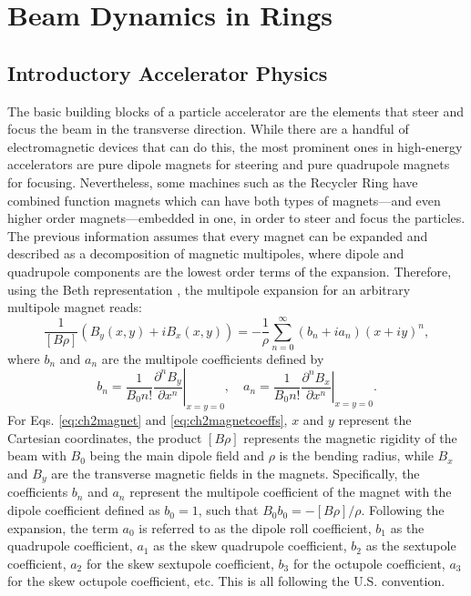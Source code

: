 \chapter{Beam Dynamics in Rings}
\label{sec:ch2}

\section{\label{sec:basic}Introductory Accelerator Physics}
The basic building blocks of a particle accelerator are the elements that steer and focus the beam in the transverse direction. While there are a handful of electromagnetic devices that can do this, the most prominent ones in high-energy accelerators are pure dipole magnets for steering and pure quadrupole magnets for focusing. Nevertheless, some machines such as the Recycler Ring have combined function magnets which can have both types of magnets---and even higher order magnets---embedded in one, in order to steer and focus the particles. The previous information assumes that every magnet can be expanded and described as a decomposition of magnetic multipoles, where dipole and quadrupole components are the lowest order terms of the expansion. Therefore, using the Beth representation \cite{sylee}, the multipole expansion for an arbitrary multipole magnet reads:
\begin{equation}
    \label{eq:ch2magnet}
    \frac{1}{\left[ B \rho \right]}\left(B_y(x,y)+iB_x(x,y) \right)=-\frac{1}{\rho} \sum_{n=0}^{\infty} \left( b_n+i a_n\right) \left( x+i y\right)^n, 
\end{equation}
where $b_n$ and $a_n$ are the multipole coefficients defined by
\begin{equation}
    \label{eq:ch2magnetcoeffs}
    b_n=\frac{1}{B_0 n!} \left. \frac{\partial^n B_y}{\partial x^n} \right| _{x=y=0}, \quad  a_n=\frac{1}{B_0 n!} \left. \frac{\partial^n B_x}{\partial x^n} \right| _{x=y=0}.  
\end{equation}
For Eqs. \ref{eq:ch2magnet} and \ref{eq:ch2magnetcoeffs}, $x$ and $y$ represent the Cartesian coordinates, the product $\left[ B \rho \right]$ represents the magnetic rigidity of the beam with $B_0$ being the main dipole field and $\rho$ is the bending radius, while $B_x$ and $B_y$ are the transverse magnetic fields in the magnets. Specifically, the coefficients $b_n$ and $a_n$ represent the multipole coefficient of the magnet with the dipole coefficient defined as $b_0=1$, such that $B_0b_0=-\left[ B \rho\right]/\rho$. Following the expansion, the term $a_0$ is referred to as the dipole roll coefficient, $b_1$ as the quadrupole coefficient, $a_1$ as the skew quadrupole coefficient, $b_2$ as the sextupole coefficient, $a_2$ for the skew sextupole coefficient, $b_3$ for the octupole coefficient, $a_3$ for the skew octupole coefficient, etc. This is all following the U.S. convention.

